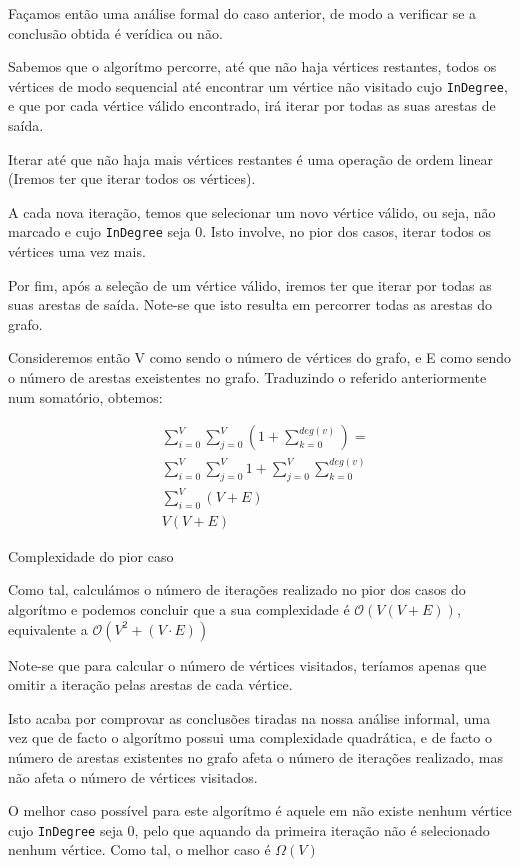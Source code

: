 Façamos então uma análise formal do caso anterior, de modo a
verificar se a conclusão obtida é verídica ou não.


Sabemos que o algorítmo percorre, até que não haja vértices
restantes, todos os vértices de modo
sequencial até encontrar um vértice não visitado cujo
\verb|InDegree|, e que por cada vértice válido encontrado, irá
iterar por todas as suas arestas de saída.

Iterar até que não haja mais vértices restantes é uma operação de
ordem linear (Iremos ter que iterar todos os vértices).

A cada nova iteração, temos que selecionar um novo vértice
válido, ou seja, não marcado e cujo \verb|InDegree| seja 0. Isto
involve, no pior dos casos, iterar todos os vértices uma vez
mais.

Por fim, após a seleção de um vértice válido, iremos ter que
iterar por todas as suas arestas de saída. Note-se que isto
resulta em percorrer todas as arestas do grafo.

Consideremos então V como sendo o número de vértices do grafo, e
E como sendo o número de arestas exeistentes no grafo. Traduzindo o referido anteriormente num somatório, obtemos:

\begin{listing}[H]
	\begin{align}
		 & \sum_{i = 0}^{V} \sum_{j=0}^{V} (1 + \sum_{k=0}^{deg(v)}) =
		\\
		 & \sum_{i = 0}^{V} \sum_{j=0}^{V} 1 + \sum_{j=0}^{V}
		\sum_{k=0}^{deg(v)}                                            \\
		 & \sum_{i=0}^{V} (V + E)                                      \\
		 & V(V+E)
	\end{align}
	\caption{Complexidade do pior caso}
\end{listing}

Como tal, calculámos o número de iterações realizado no pior dos
casos do algorítmo e podemos concluir que a sua complexidade é
$\mathcal{O}(V(V+E))$, equivalente a $\mathcal{O}(V^2+(V \cdot E))$

Note-se que para calcular o número de vértices visitados, teríamos apenas que omitir a iteração pelas arestas de cada
vértice.

Isto acaba por comprovar as conclusões tiradas na nossa análise informal, uma vez que de facto o algorítmo possui uma
complexidade quadrática, e de facto o número de arestas existentes no grafo afeta o número de iterações realizado, mas
não afeta o número de vértices visitados.


O melhor caso possível para este algorítmo é aquele em não existe
nenhum vértice cujo \verb|InDegree| seja 0, pelo que aquando da
primeira iteração não é selecionado nenhum vértice. Como tal, o
melhor caso é $\Omega(V)$
